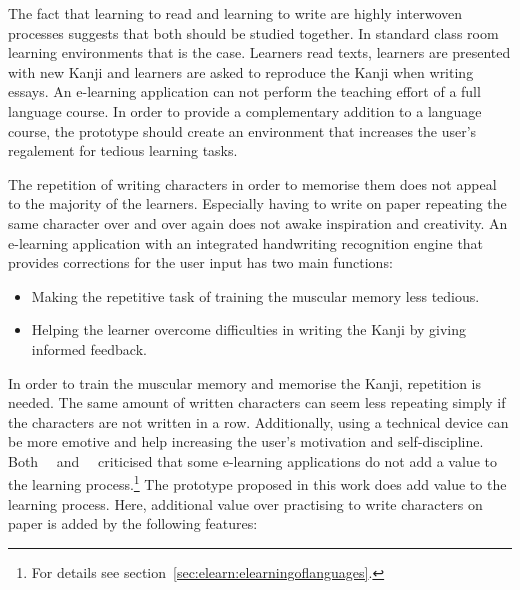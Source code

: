 The fact that learning to read and learning to write are highly interwoven 
processes suggests that both should be studied together. In standard class room 
learning environments that is the case. Learners read texts, learners are 
presented with new Kanji and learners are asked to reproduce the Kanji when 
writing essays.
An e-learning application can not perform the teaching effort of a full language
course. In order to provide a complementary addition to a language course,
the prototype should create an environment that increases the user's regalement 
for tedious learning tasks.

The repetition of writing characters in order to memorise them does not
appeal to the majority of the learners. Especially having to write on paper
repeating the same character over and over again does not awake inspiration
and creativity. An e-learning application with an integrated handwriting 
recognition engine that provides corrections for the user input has two 
main functions:
\begin{itemize}
  \item Making the repetitive task of training the muscular memory less tedious.
  \item Helping the learner overcome difficulties in writing the Kanji by 
        giving informed feedback.
\end{itemize}
In order to train the muscular memory and memorise the Kanji, repetition is 
needed. The same amount of written characters can seem less repeating simply if
the characters are not written in a row. Additionally, using a technical device 
can be more emotive and help increasing the user's motivation and 
self-discipline. Both~~\citeyear{Ismail2002}
and~~\citeyear{Richert2007}
criticised that some 
e-learning applications do not add a value to the learning 
process.\footnote{For details see section~\ref{sec:elearn:elearningoflanguages}.}
The prototype proposed in this work does add value to the learning process.
Here, additional value over practising to write characters on paper is added
by the following features:
